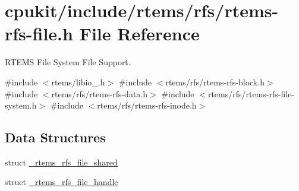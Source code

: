 \hypertarget{rtems-rfs-file_8h}{}\section{cpukit/include/rtems/rfs/rtems-\/rfs-\/file.h File Reference}
\label{rtems-rfs-file_8h}


R\+T\+E\+MS File System File Support.  


{\ttfamily \#include $<$rtems/libio\+\_\+.\+h$>$}\newline
{\ttfamily \#include $<$rtems/rfs/rtems-\/rfs-\/block.\+h$>$}\newline
{\ttfamily \#include $<$rtems/rfs/rtems-\/rfs-\/data.\+h$>$}\newline
{\ttfamily \#include $<$rtems/rfs/rtems-\/rfs-\/file-\/system.\+h$>$}\newline
{\ttfamily \#include $<$rtems/rfs/rtems-\/rfs-\/inode.\+h$>$}\newline
\subsection*{Data Structures}
\begin{DoxyCompactItemize}
\item 
struct \mbox{\hyperlink{struct__rtems__rfs__file__shared}{\+\_\+rtems\+\_\+rfs\+\_\+file\+\_\+shared}}
\item 
struct \mbox{\hyperlink{struct__rtems__rfs__file__handle}{\+\_\+rtems\+\_\+rfs\+\_\+file\+\_\+handle}}
\end{DoxyCompactItemize}
